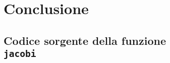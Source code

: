 \documentclass[
	a4paper,
	twoside,
	12pt
]{book}
\begin{document}
\chapter*{Conclusione}
\label{cap:conclusione}

\begin{appendix}
\chapter[Codice sorgente della funzione jacobi]{Codice sorgente della funzione \\ \texttt{jacobi}}
\label{app:codiceSorgenteJacobi}

\end{appendix}
\backmatter
\printbibliography[heading=bibintoc, title={Bibliografia}]
\end{document}
